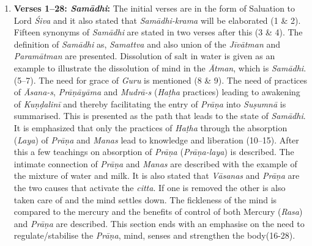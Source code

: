 \begin{enumerate}
\item \textbf{Verses 1--28:  \textit{Samādhi}:} The initial verses are in the form of Saluation to Lord \textit{Śiva} and it also stated that \textit{Samādhi-krama} will be elaborated (1 \& 2). Fifteen synonyms of \textit{Samādhi} are stated in two verses after this (3 \& 4). The definition of \textit{Samādhi} as, \textit{Samattva} and also union of the \textit{Jīvātman} and \textit{Paramātman} are presented. Dissolution of salt in water is given as an example to illustrate the dissolution of mind in the \textit{Ātman}, which is \textit{Samādhi}.(5--7). The need for grace of \textit{Guru} is mentioned (8 \& 9). The need of practices of \textit{Āsana-s}, \textit{Prāṇāyāma} and \textit{Mudrā-s} (\textit{Haṭha} practices) leading to awakening of \textit{Kuṇḍalinī}  and thereby facilitating the entry of \textit{Prāṇa} into \textit{Suṣumnā} is summarised. This is presented as the path that leads to the state of \textit{Samādhi}. It is emphasized that only the practices of \textit{Haṭha} through the absorption (\textit{Laya}) of \textit{Prāṇa} and \textit{Manas} lead to  knowledge and liberation (10--15). After this a few teachings on absorption of \textit{Prāṇa} (\textit{Prāṇa-laya}) is described. The intimate connection of \textit{Prāṇa} and \textit{Manas} are described with the example of the mixture of water and milk. It is also stated that \textit{Vāsanas} and \textit{Prāṇa} are the two causes that activate the \textit{citta}. If one is removed the other is also taken care of and the mind settles down. The fickleness of the mind is compared to the mercury and the benefits of control of both Mercury (\textit{Rasa}) and \textit{Prāṇa} are described. This section ends with an emphasise on the need to regulate/stabilise the \textit{Prāṇa}, mind, senses and strengthen the body(16-28).


\end{enumerate}
